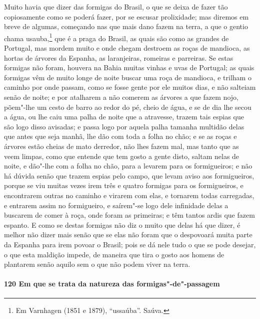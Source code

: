 Muito havia que dizer das formigas do Brasil, o que se deixa de fazer tão copiosamente
como se poderá fazer, por se escusar prolixidade; mas diremos em breve de algumas,
começando nas que mais dano fazem na terra, a que o gentio chama usauba,\footnote{ Em
Varnhagen (1851 e 1879), ``ussaúba''. Saúva.} que é a praga do Brasil, as quais são como
as grandes de Portugal, mas mordem muito e onde chegam destroem as roças de mandioca, as
hortas de árvores da Espanha, as laranjeiras, romeiras e parreiras. Se estas formigas não
foram, houvera na Bahia muitas vinhas e uvas de Portugal; as quais formigas vêm de muito
longe de noite buscar uma roça de mandioca, e trilham o caminho por onde passam, como se
fosse gente por ele muitos dias, e não salteiam senão de noite; e por atalharem a não
comerem as árvores a que fazem nojo, põem"-lhe um cesto de barro ao redor do pé, cheio de
água, e se de dia lhe secou a água, ou lhe caiu uma palha de noite que a atravesse, trazem
tais espias que são logo disso avisadas; e passa logo por aquela palha tamanha multidão
delas que antes que seja manhã, lhe dão com toda a folha no chão; e se as roças e árvores
estão cheias de mato derredor, não lhes fazem mal, mas tanto que as veem limpas, como que
entende que tem gosto a gente disto, saltam nelas de noite, e dão"-lhe com a folha no chão,
para a levarem para os formigueiros; e não há dúvida senão que trazem espias pelo campo,
que levam aviso aos formigueiros, porque se viu muitas vezes irem três e quatro formigas
para os formigueiros, e encontrarem outras no caminho e virarem com elas, e tornarem todas
carregadas, e entrarem assim no formigueiro, e saírem"-se logo dele infinidade delas a
buscarem de comer à roça, onde foram as primeiras; e têm tantos ardis que fazem espanto. E
como se destas formigas não diz o muito que delas há que dizer, é melhor não dizer mais
senão que se elas não foram que o despovoará muita parte da Espanha para irem povoar o
Brasil; pois se dá nele tudo o que se pode desejar, o que esta maldição impede, de maneira
que tira o gosto aos homens de plantarem senão aquilo sem o que não podem viver na terra.

\paragraph{120 Em que se trata da natureza das formigas"-de"-passagem}

